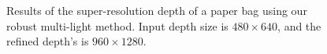 \begin{figure}[!ht]
\quad
{}
\caption{Results of the super-resolution depth of a paper bag using our robust multi-light method. Input depth size is $480\times 640$, and the refined depth's is $960 \times 1280$.}
\label{fig:robust_sr}
\end{figure}


 
